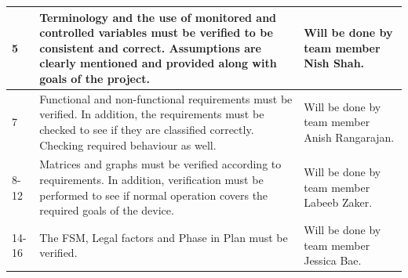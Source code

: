 \documentclass[12pt, titlepage]{article}
\begin{document}
\begin{center}
\begin{tabular}{|m{2cm}|m{9cm}|m{4cm}|}
    \hline
    5                  &  Terminology and the use of monitored and controlled variables must be verified to be consistent and correct. Assumptions are clearly mentioned and provided along with goals of the project. & Will be done by team member  Nish Shah.                                                      \\
    \hline
  7                     & Functional and non-functional requirements must be verified. In addition, the requirements must be checked to see if they are classified correctly. Checking required behaviour as well.                              & Will be done by team member Anish Rangarajan.                                                \\
    \hline
8-12&  Matrices and graphs must be verified according to requirements. In addition, verification must be performed to see if normal operation covers the required goals of the device.                                         & Will be done by team member Labeeb Zaker.                                                    \\
    \hline
14-16                                           & The FSM, Legal factors and Phase in Plan must be verified.                                                                                                                                 & Will be done by team member Jessica Bae.                                                     \\
    \hline
  \end{tabular}
\end{center}
\pagebreak

\end{document}

